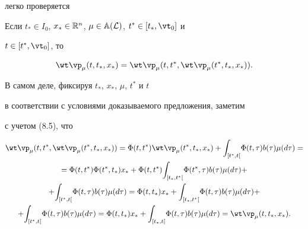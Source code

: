 легко проверяется





\begin{props}


Если ${t_*} \in {I_0}$, ${x_*} \in {{\Bbb R}^n}$, $\mu \in


{{\Bbb A}({\cal L})}$, ${t^*} \in [{t_*},{{\vt}_0}]$ и


$t \in [{t^*},{{\vt}_0}]$, то


$$


{{\wt \vp}_\mu}(t,{t_*},{x_*}) =


{{\wt \vp}_\mu}(t,{t^*},{{\wt \vp}_\mu}({t^*},{t_*},{x_*})).


$$


\end{props}





В самом деле, фиксируя ${t_*}$, ${x_*}$, $\mu$, ${t^*}$ и $t$


в соответствии с условиями доказываемого предложения, заметим


с учетом (8.5), что


\begin{multline*}


{{\wt \vp}_\mu}(t,{t^*},{{\wt \vp}_\mu}({t^*},{t_*},{x_*})) =


{\Phi}(t,{t^*}){{\wt \vp}_\mu}({t^*},{t_*},{x_*}) +


{\int_{[{t^*},t[}}{\Phi}(t,\tau){b(\tau)}{\mu}(d\tau) =\\


= {\Phi}(t,{t^*}){\Phi}({t^*},{t_*}){x_*} +


{\Phi}(t,{t^*}){\int_{[{t_*},{t^*}[}}{\Phi}({t^*},\tau){b(\tau)}{\mu}(d\tau)


+\\


+ {\int_{[{t^*},t[}}{\Phi}(t,\tau){b(\tau)}{\mu}(d\tau)


= {\Phi}(t,{t_*}){x_*} +


{\int_{[{t_*},{t^*}[}}{\Phi}(t,\tau){b(\tau)}{\mu}(d\tau) +\\


+ {\int_{[{t^*},t[}}{\Phi}(t,\tau){b(\tau)}{\mu}(d\tau) =


{\Phi}(t,{t_*}){x_*} +


{\int_{[{t_*},t[}}{\Phi}(t,\tau){b(\tau)}{\mu}(d\tau) =


{{\wt \vp}_\mu}(t,{t_*},{x_*}).


\end{multline*}





